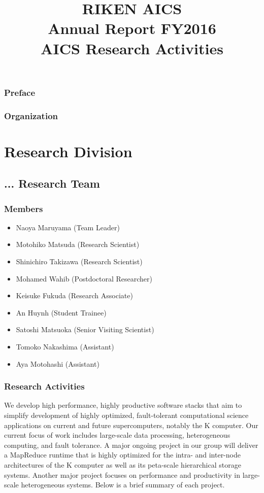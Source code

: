 \documentclass{book}
\title{RIKEN AICS\\
       Annual Report FY2016\\
      AICS Research Activities}
\author{}
\begin{document}
\maketitle

\section*{Preface}

\newpage

\section*{Organization}


\tableofcontents

\part{Research Division}

\chapter{... Research Team}

\section{Members}

\begin{itemize}
  \item[] Naoya Maruyama (Team Leader)
  \item[] Motohiko Matsuda (Research Scientist)
  \item[] Shinichiro Takizawa (Research Scientist)
  \item[] Mohamed Wahib (Postdoctoral Researcher)
  \item[] Keisuke Fukuda (Research Associate)
  \item[] An Huynh (Student Trainee)
  \item[] Satoshi Matsuoka (Senior Visiting Scientist)
  \item[] Tomoko Nakashima (Assistant)
  \item[] Aya Motohashi (Assistant)
\end{itemize}


\section{Research Activities}

We develop high performance, highly productive software stacks that aim to simplify development of highly optimized, fault-tolerant computational science applications on current and future supercomputers, notably the K computer. Our current focus of work includes large-scale data processing, heterogeneous computing, and fault tolerance. A major ongoing project in our group will deliver a MapReduce runtime that is highly optimized for the intra- and inter-node architectures of the K computer as well as its peta-scale hierarchical storage systems. Another major project focuses on performance and productivity in large-scale heterogeneous systems. Below is a brief summary of each project.
\end{document}
